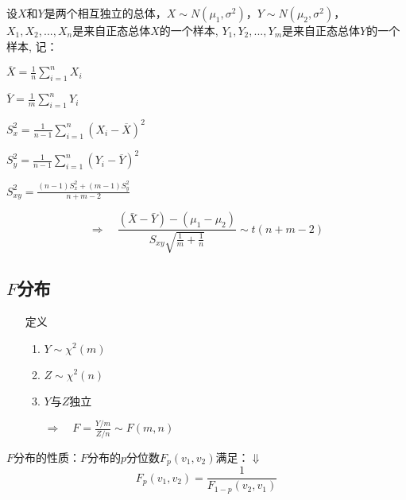 \documentclass[UTF8,10pt]{book}
\begin{document}
            设$X$和$Y$是两个相互独立的总体，$X \sim N(\mu_1,\sigma^2)$，$Y \sim N(\mu_2,\sigma^2)$，
            $X_1,X_2,...,X_n$是来自正态总体$X$的一个样本,
            $Y_1,Y_2,...,Y_m$是来自正态总体$Y$的一个样本,
            记：

            $ \overline{X} = \frac{1}{n} \sum_{i=1}^n X_i $

            $ \overline{Y} = \frac{1}{m} \sum_{i=1}^n Y_i $

            $ S_x^2 = \frac{1}{n-1}  \sum_{i=1}^n (X_i -\overline{X})^2 $

            $ S_y^2 = \frac{1}{n-1}  \sum_{i=1}^n (Y_i -\overline{Y})^2 $

            $ S_{xy}^2 = \frac{  (n-1)S_x^2 + (m-1)S_y^2  }   {  n+m-2  } $

            $$ \Rightarrow \quad \frac{(\bar{X}-\bar{Y})-\left(\mu_{1}-\mu_{2}\right)}{S_{x y} \sqrt{\frac{1}{m}+\frac{1}{n}}}  \sim t(n+m-2) $$





        \subsection{$F$分布}
            \begin{itemize}
                \item [定义] {
                    \begin{enumerate}
                        \item $Y \sim \chi^2(m)$
                        \item $Z \sim \chi^2(n)$
                        \item $Y$与$Z$独立
                        
                        $\Rightarrow \quad F = \frac{Y/m}{Z/n} \sim F(m,n)$ 
                    \end{enumerate}
                }
            \end{itemize}
            
            $F$分布的性质：$F$分布的$p$分位数$F_p(v_1,v_2)$满足：$\Downarrow$
            $$ F_p(v_1,v_2) = \frac{1}{F_{1-p}(v_2,v_1)} $$
            
\end{document}

